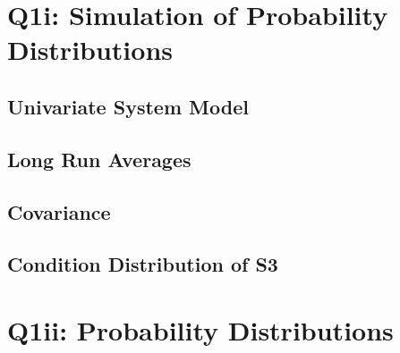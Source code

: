 \documentclass[12pt]{article}
\begin{document}
\tableofcontents
\listoffigures
{}
\listoftables
{}
\thispagestyle{empty}
\cleardoublepage
\setcounter{page}{1}

\section{Q1i: Simulation of Probability Distributions}
\subsection{Univariate System Model}
\subsection{Long Run Averages}
\subsection{Covariance}
\subsection{Condition Distribution of S3}
\clearpage

\section{Q1ii: Probability Distributions}
\end{document}
